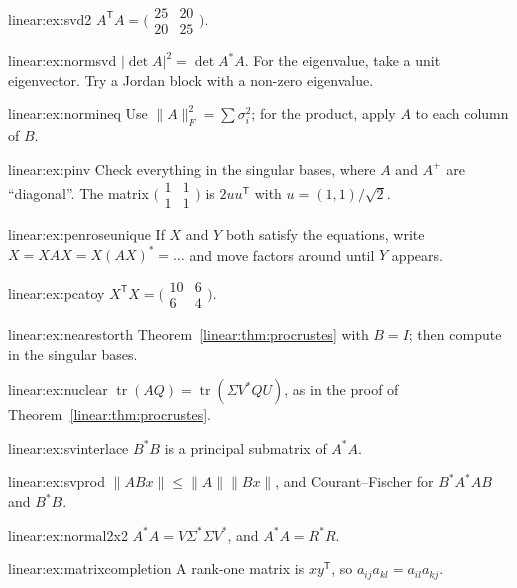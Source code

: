 \begin{hint}{linear:ex:svd2}
$A^{\mathsf T}A=\bigl(\begin{smallmatrix}25&20\\20&25\end{smallmatrix}\bigr)$.
\end{hint}
\begin{hint}{linear:ex:normsvd}
$|\det A|^2=\det A^*A$. For the eigenvalue, take a unit eigenvector. Try a Jordan block with a non-zero eigenvalue.
\end{hint}
\begin{hint}{linear:ex:normineq}
Use $\|A\|_F^2=\sum\sigma_i^2$; for the product, apply $A$ to each column of $B$.
\end{hint}
\begin{hint}{linear:ex:pinv}
Check everything in the singular bases, where $A$ and $A^+$ are ``diagonal''. The matrix $\bigl(\begin{smallmatrix}1&1\\1&1\end{smallmatrix}\bigr)$
is $2uu^{\mathsf T}$ with $u=(1,1)/\sqrt2$.
\end{hint}
\begin{hint}{linear:ex:penroseunique}
If $X$ and $Y$ both satisfy the equations, write $X=XAX=X(AX)^*=\dots$ and move factors around until $Y$ appears.
\end{hint}
\begin{hint}{linear:ex:pcatoy}
$X^{\mathsf T}X=\bigl(\begin{smallmatrix}10&6\\6&4\end{smallmatrix}\bigr)$.
\end{hint}
\begin{hint}{linear:ex:nearestorth}
Theorem~\ref{linear:thm:procrustes} with $B=I$; then compute in the singular bases.
\end{hint}
\begin{hint}{linear:ex:nuclear}
$\operatorname{tr}(AQ)=\operatorname{tr}(\Sigma V^*QU)$, as in the proof of Theorem~\ref{linear:thm:procrustes}.
\end{hint}
\begin{hint}{linear:ex:svinterlace}
$B^*B$ is a principal submatrix of $A^*A$.
\end{hint}
\begin{hint}{linear:ex:svprod}
$\|ABx\|\le\|A\|\|Bx\|$, and Courant--Fischer for $B^*A^*AB$ and $B^*B$.
\end{hint}
\begin{hint}{linear:ex:normal2x2}
$A^*A=V\Sigma^*\Sigma V^*$, and $A^*A=R^*R$.
\end{hint}
\begin{hint}{linear:ex:matrixcompletion}
A rank-one matrix is $xy^{\mathsf T}$, so $a_{ij}a_{kl}=a_{il}a_{kj}$.
\end{hint}

